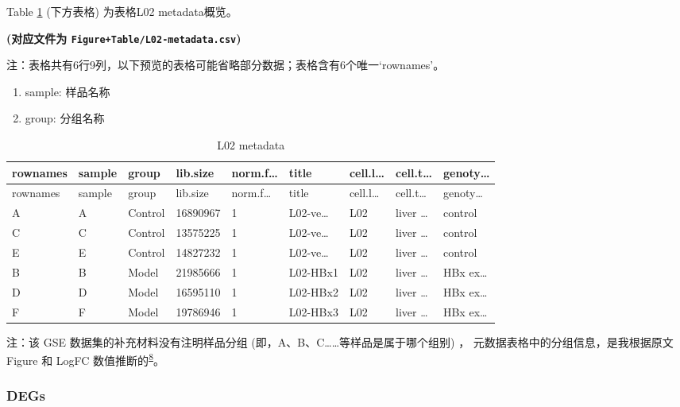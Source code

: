 \documentclass[
]{article}
\providecommand{\tightlist}{%
  \setlength{\itemsep}{0pt}\setlength{\parskip}{0pt}}
\begin{document}
Table \ref{tab:L02-metadata} (下方表格) 为表格L02 metadata概览。

\textbf{(对应文件为 \texttt{Figure+Table/L02-metadata.csv})}

\begin{center}\begin{tcolorbox}[colback=gray!10, colframe=gray!50, width=0.9\linewidth, arc=1mm, boxrule=0.5pt]注：表格共有6行9列，以下预览的表格可能省略部分数据；表格含有6个唯一`rownames'。
\end{tcolorbox}
\end{center}
\begin{center}\begin{tcolorbox}[colback=gray!10, colframe=gray!50, width=0.9\linewidth, arc=1mm, boxrule=0.5pt]\begin{enumerate}\tightlist
\item sample:  样品名称
\item group:  分组名称
\end{enumerate}\end{tcolorbox}
\end{center}

\begin{longtable}[]{@{}lllllllll@{}}
\caption{\label{tab:L02-metadata}L02 metadata}\tabularnewline
\toprule
rownames & sample & group & lib.size & norm.f\ldots{} & title & cell.l\ldots{} & cell.t\ldots{} & genoty\ldots{}\tabularnewline
\midrule
\endfirsthead
\toprule
rownames & sample & group & lib.size & norm.f\ldots{} & title & cell.l\ldots{} & cell.t\ldots{} & genoty\ldots{}\tabularnewline
\midrule
\endhead
A & A & Control & 16890967 & 1 & L02-ve\ldots{} & L02 & liver \ldots{} & control\tabularnewline
C & C & Control & 13575225 & 1 & L02-ve\ldots{} & L02 & liver \ldots{} & control\tabularnewline
E & E & Control & 14827232 & 1 & L02-ve\ldots{} & L02 & liver \ldots{} & control\tabularnewline
B & B & Model & 21985666 & 1 & L02-HBx1 & L02 & liver \ldots{} & HBx ex\ldots{}\tabularnewline
D & D & Model & 16595110 & 1 & L02-HBx2 & L02 & liver \ldots{} & HBx ex\ldots{}\tabularnewline
F & F & Model & 19786946 & 1 & L02-HBx3 & L02 & liver \ldots{} & HBx ex\ldots{}\tabularnewline
\bottomrule
\end{longtable}

注：该 GSE 数据集的补充材料没有注明样品分组 (即，A、B、C\ldots\ldots 等样品是属于哪个组别) ，
元数据表格中的分组信息，是我根据原文 Figure 和 LogFC 数值推断的\textsuperscript{\protect\hyperlink{ref-HbxIncreasesCZheng2022}{8}}。

\hypertarget{degs}{%
\subsubsection{DEGs}\label{degs}}
\end{document}
